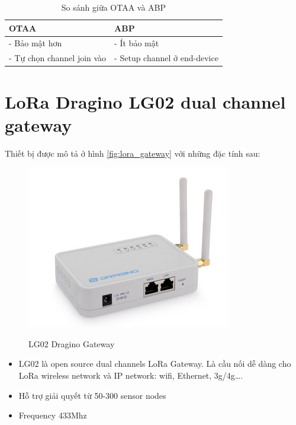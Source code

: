 \begin{table}[H]
    \centering
    \caption{So sánh giữa OTAA và ABP} 
    \label{tab.network.otaa}
    \begin{tabular}{| m{6cm} | m{6cm} |}
        \hline
        OTAA & ABP \\

        \hline
        -	Bảo mật hơn & - Ít bảo mật \\
        -	Tự chọn channel join vào & - Setup channel ở end-device \\
        
        \hline
    \end{tabular}
\end{table}

\section{LoRa Dragino LG02 dual channel gateway}
Thiết bị được mô tả ở hình \ref{fig:lora_gateway} với những đặc tính sau:
\begin{figure}[H]
    \includegraphics[width=\textwidth]{images/Quanh/lora_gateway.png}
    \caption{LG02 Dragino Gateway} \cite{lg02dragino}
    \label{fig:lorawan_gateway}
\end{figure}

\begin{itemize}
    \item LG02 là open source dual channels LoRa Gateway. Là cầu nối dễ dàng cho LoRa wireless network và IP network: wifi, Ethernet, 3g/4g\dots .
    \item Hỗ trợ giải quyết từ 50-300 sensor nodes
    \item Frequency 433Mhz
\end{itemize}

